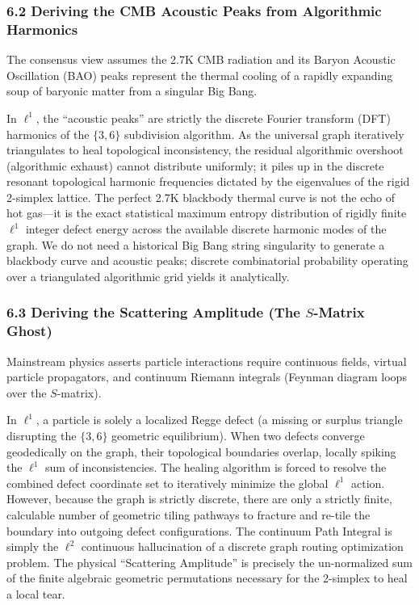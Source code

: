\documentclass[
]{article}
\begin{document}
\hypertarget{deriving-the-cmb-acoustic-peaks-from-algorithmic-harmonics}{%
\subsubsection{6.2 Deriving the CMB Acoustic Peaks from Algorithmic
Harmonics}\label{deriving-the-cmb-acoustic-peaks-from-algorithmic-harmonics}}

The consensus view assumes the 2.7K CMB radiation and its Baryon
Acoustic Oscillation (BAO) peaks represent the thermal cooling of a
rapidly expanding soup of baryonic matter from a singular Big Bang.

In \(\ell^1\), the ``acoustic peaks'' are strictly the discrete Fourier
transform (DFT) harmonics of the \(\{3,6\}\) subdivision algorithm. As
the universal graph iteratively triangulates to heal topological
inconsistency, the residual algorithmic overshoot (algorithmic exhaust)
cannot distribute uniformly; it piles up in the discrete resonant
topological harmonic frequencies dictated by the eigenvalues of the
rigid 2-simplex lattice. The perfect 2.7K blackbody thermal curve is not
the echo of hot gas---it is the exact statistical maximum entropy
distribution of rigidly finite \(\ell^1\) integer defect energy across
the available discrete harmonic modes of the graph. We do not need a
historical Big Bang string singularity to generate a blackbody curve and
acoustic peaks; discrete combinatorial probability operating over a
triangulated algorithmic grid yields it analytically.

\hypertarget{deriving-the-scattering-amplitude-the-s-matrix-ghost}{%
\subsubsection{\texorpdfstring{6.3 Deriving the Scattering Amplitude
(The \(S\)-Matrix
Ghost)}{6.3 Deriving the Scattering Amplitude (The S-Matrix Ghost)}}\label{deriving-the-scattering-amplitude-the-s-matrix-ghost}}

Mainstream physics asserts particle interactions require continuous
fields, virtual particle propagators, and continuum Riemann integrals
(Feynman diagram loops over the \(S\)-matrix).

In \(\ell^1\), a particle is solely a localized Regge defect (a missing
or surplus triangle disrupting the \(\{3,6\}\) geometric equilibrium).
When two defects converge geodedically on the graph, their topological
boundaries overlap, locally spiking the \(\ell^1\) sum of
inconsistencies. The healing algorithm is forced to resolve the combined
defect coordinate set to iteratively minimize the global \(\ell^1\)
action. However, because the graph is strictly discrete, there are only
a strictly finite, calculable number of geometric tiling pathways to
fracture and re-tile the boundary into outgoing defect configurations.
The continuum Path Integral is simply the \(\ell^2\) continuous
hallucination of a discrete graph routing optimization problem. The
physical ``Scattering Amplitude'' is precisely the un-normalized sum of
the finite algebraic geometric permutations necessary for the 2-simplex
to heal a local tear.
\end{document}
